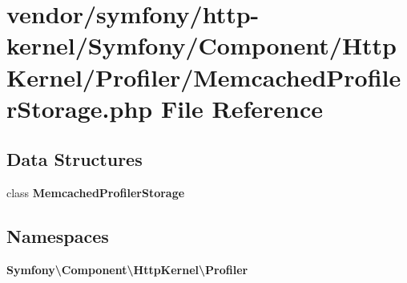 \section{vendor/symfony/http-\/kernel/\+Symfony/\+Component/\+Http\+Kernel/\+Profiler/\+Memcached\+Profiler\+Storage.php File Reference}
\label{_memcached_profiler_storage_8php}
\subsection*{Data Structures}
\begin{DoxyCompactItemize}
\item 
class {\bf Memcached\+Profiler\+Storage}
\end{DoxyCompactItemize}
\subsection*{Namespaces}
\begin{DoxyCompactItemize}
\item 
 {\bf Symfony\textbackslash{}\+Component\textbackslash{}\+Http\+Kernel\textbackslash{}\+Profiler}
\end{DoxyCompactItemize}
